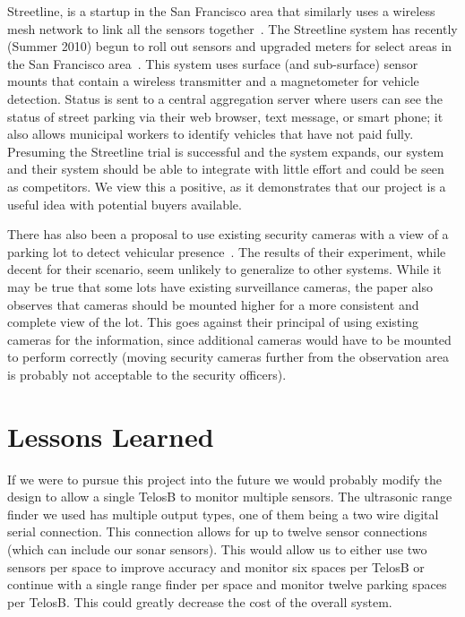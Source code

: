\documentclass{acm_proc}
\begin{document}
Streetline, is a startup in the San Francisco area that similarly uses a
wireless mesh network to link all the sensors
together~\cite{pgi:streetline}.
The Streetline system has recently (Summer 2010) begun to roll out sensors
and upgraded meters for select areas in the San Francisco
area~\cite{wired:streetline, sfpark}.
This system uses surface (and sub-surface) sensor mounts that contain a
wireless transmitter and a magnetometer for vehicle detection.
Status is sent to a central aggregation server where users can see the
status of street parking via their web browser, text message, or smart
phone; it also allows municipal workers to identify vehicles that have not
paid fully.
Presuming the Streetline trial is successful and the system expands, our
system and their system should be able to integrate with little effort and
could be seen as competitors.
We view this a positive, as it demonstrates that our project is a useful
idea with potential buyers available.

There has also been a proposal to use existing security cameras with a view
of a parking lot to detect vehicular presence~\cite{lin:vision-parking}.
The results of their experiment, while decent for their scenario, seem
unlikely to generalize to other systems.
While it may be true that some lots have existing surveillance cameras, the
paper also observes that cameras should be mounted higher for a more
consistent and complete view of the lot.
This goes against their principal of using existing cameras for the
information, since additional cameras would have to be mounted to perform
correctly (moving security cameras further from the observation area is
probably not acceptable to the security officers).

\section{Lessons Learned}\label{sec:lessons}

If we were to pursue this project into the future we would probably modify
the design to allow a single TelosB to monitor multiple sensors.  The
ultrasonic range finder we used has multiple output types, one of them
being a two wire digital serial connection.  This connection allows for up
to twelve sensor connections (which can include our sonar sensors).
This would allow us to either use two sensors per space to improve accuracy
and monitor six spaces per TelosB or continue with a single range finder
per space and monitor twelve parking spaces per TelosB.
This could greatly decrease the cost of the overall system.
\end{document}

